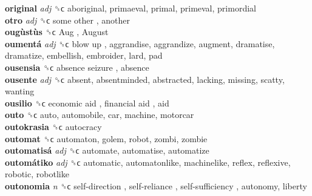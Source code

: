 \textbf{original} \emph{adj}  ␝ϲ  aboriginal, primaeval, primal, primeval, primordial  \\
\textbf{otro} \emph{adj}  ␝ϲ   some other , another  \\
\textbf{ougùstùs} ␝ϲ   Aug ,  August   \\
\textbf{oumentá} \emph{adj}  ␝ϲ   blow up , aggrandise, aggrandize, augment, dramatise, dramatize, embellish, embroider, lard, pad  \\
\textbf{ousensia} ␝ϲ   absence seizure , absence  \\
\textbf{ousente} \emph{adj}  ␝ϲ  absent, absentminded, abstracted, lacking, missing, scatty, wanting  \\
\textbf{ousilio} ␝ϲ   economic aid ,  financial aid , aid  \\
\textbf{outo} ␝ϲ  auto, automobile, car, machine, motorcar  \\
\textbf{outokrasia} ␝ϲ  autocracy  \\
\textbf{outomat} ␝ϲ  automaton, golem, robot, zombi, zombie  \\
\textbf{outomatisá} \emph{adj}  ␝ϲ  automate, automatise, automatize  \\
\textbf{outomátiko} \emph{adj}  ␝ϲ  automatic, automatonlike, machinelike, reflex, reflexive, robotic, robotlike  \\
\textbf{outonomia} \emph{n}  ␝ϲ   self-direction ,  self-reliance ,  self-sufficiency , autonomy, liberty  \\
